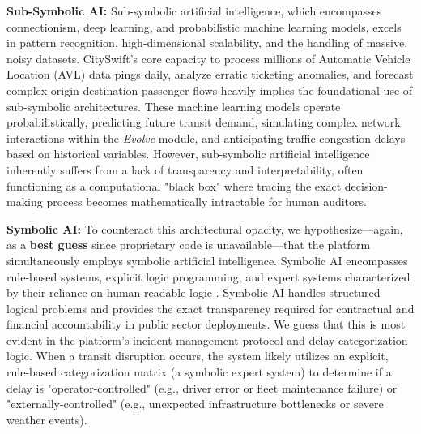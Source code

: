 \documentclass[]
{UCD_CS_41820_Report}
\begin{document}
\textbf{Sub-Symbolic AI:} Sub-symbolic artificial intelligence, which encompasses connectionism, deep learning, and probabilistic machine learning models, excels in pattern recognition, high-dimensional scalability, and the handling of massive, noisy datasets. CitySwift's core capacity to process millions of Automatic Vehicle Location (AVL) data pings daily, analyze erratic ticketing anomalies, and forecast complex origin-destination passenger flows heavily implies the foundational use of sub-symbolic architectures. These machine learning models operate probabilistically, predicting future transit demand, simulating complex network interactions within the \textit{Evolve} module, and anticipating traffic congestion delays based on historical variables. However, sub-symbolic artificial intelligence inherently suffers from a lack of transparency and interpretability, often functioning as a computational "black box" where tracing the exact decision-making process becomes mathematically intractable for human auditors.

\textbf{Symbolic AI:} To counteract this architectural opacity, we hypothesize—again, as a \textbf{best guess} since proprietary code is unavailable—that the platform simultaneously employs symbolic artificial intelligence. Symbolic AI encompasses rule-based systems, explicit logic programming, and expert systems characterized by their reliance on human-readable logic \cite{intro_prop_logic}. Symbolic AI handles structured logical problems and provides the exact transparency required for contractual and financial accountability in public sector deployments. We guess that this is most evident in the platform's incident management protocol and delay categorization logic. When a transit disruption occurs, the system likely utilizes an explicit, rule-based categorization matrix (a symbolic expert system) to determine if a delay is "operator-controlled" (e.g., driver error or fleet maintenance failure) or "externally-controlled" (e.g., unexpected infrastructure bottlenecks or severe weather events).
\end{document}
